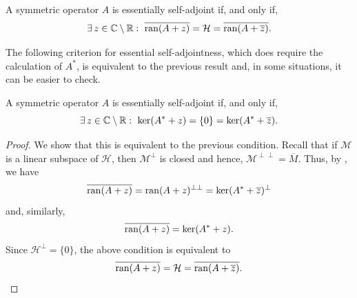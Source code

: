 \begin{theorem}
A symmetric operator $A$ is essentially self-adjoint if, and only if, 
\begin{equation*}
\exists \, z\in \C\setminus \R : \ \overline{\ran(A+z)}=\mathcal{H}=\overline{\ran(A+\overline{z})}. 
\end{equation*}
\end{theorem}

The following criterion for essential self-adjointness, which does require the calculation of $A^*$, is equivalent to the previous result and, in some situations, it can be easier to check.

\begin{theorem}
A symmetric operator $A$ is essentially self-adjoint if, and only if,
\begin{equation*}
\exists \, z\in \C\setminus \R : \ \ker(A^*+z)=\{0\}=\ker(A^*+\overline{z}). 
\end{equation*}
\end{theorem}

\begin{proof}
We show that this is equivalent to the previous condition. Recall that if $\mathcal{M}$ is a linear subspace of $\mathcal{H}$, then $\mathcal{M}^{\perp}$ is closed and hence, $\mathcal{M}^{\perp\perp}=\overline{M}$. Thus, by , we have
\begin{equation*}
\overline{\operatorname{ran}(A+z)}  =  \operatorname{ran}(A+z)^{\perp\perp}
 =  \ker(A^*+\overline{z})^{\perp}
\end{equation*}
and, similarly,
\begin{equation*}
\overline{\operatorname{ran}(A+z)} = \ker(A^*+z).
\end{equation*}
Since $\mathcal{H}^{\perp}=\{0\}$, the above condition is equivalent to
\begin{equation*}
\overline{\operatorname{ran}(A+z)}=\mathcal{H}=\overline{\operatorname{ran}(A+\overline{z})}.\qedhere
\end{equation*}
\end{proof}





















